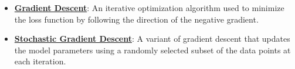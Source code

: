 \documentclass{article}%
\begin{document}
\begin{itemize}[leftmargin=*]
\item \href{https://purdue.brightspace.com/d2l/common/assets/pdfjs-d2l-dist/1.0.14-legacy/web/viewer.html?file=%2Fcontent%2Fenforced%2F1095467-wl.202510.CS.24300.001%2F05L2-ML Basics.pdf%3Fou%3D1095467&lang=en-us&container=d2l-fileviewer-rendered-pdf&fullscreen=d2l-fileviewer-rendered-pdf-dialog&height=667#page=28}{\textbf{Gradient Descent}}: An iterative optimization algorithm used to minimize the loss function by following the direction of the negative gradient.%
\item \href{https://purdue.brightspace.com/d2l/common/assets/pdfjs-d2l-dist/1.0.14-legacy/web/viewer.html?file=%2Fcontent%2Fenforced%2F1095467-wl.202510.CS.24300.001%2F05L2-ML Basics.pdf%3Fou%3D1095467&lang=en-us&container=d2l-fileviewer-rendered-pdf&fullscreen=d2l-fileviewer-rendered-pdf-dialog&height=667#page=29}{\textbf{Stochastic Gradient Descent}}: A variant of gradient descent that updates the model parameters using a randomly selected subset of the data points at each iteration.%
\end{itemize}%
\end{document}
